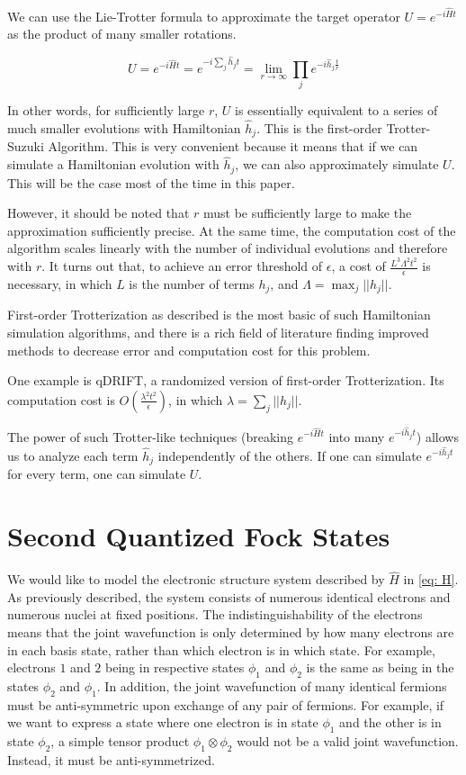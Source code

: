 We can use the Lie-Trotter formula to approximate the target operator $U = e^{-i\hat{H}t}$ as the product of many smaller rotations.

\begin{equation}
    U = e^{-i\hat{H}t} = e^{-i\sum_j \hat{h}_jt} = \lim_{r \rightarrow \infty} \prod_j e^{-i\hat{h}_j\frac{t}{r}}
\end{equation}

In other words, for sufficiently large $r$, $U$ is essentially equivalent to a series of much smaller evolutions with Hamiltonian $\hat{h}_j$. This is the first-order Trotter-Suzuki Algorithm. This is very convenient because it means that if we can simulate a Hamiltonian evolution with $\hat{h}_j$, we can also approximately simulate $U$. This will be the case most of the time in this paper.

However, it should be noted that $r$ must be sufficiently large to make the approximation sufficiently precise. At the same time, the computation cost of the algorithm scales linearly with the number of individual evolutions and therefore with $r$. It turns out that, to achieve an error threshold of $\epsilon$, a cost of $\frac{L^3\Lambda^2t^2}{\epsilon}$ is necessary, in which $L$ is the number of terms $h_j$, and $\Lambda = \max_j ||h_j||$.

First-order Trotterization as described is the most basic of such Hamiltonian simulation algorithms, and there is a rich field of literature finding improved methods to decrease error and computation cost for this problem.

One example is qDRIFT, a randomized version of first-order Trotterization. Its computation cost is $O(\frac{\lambda^2 t^2}{\epsilon})$, in which $\lambda = \sum_j ||h_j||$.

The power of such Trotter-like techniques (breaking $e^{-i\hat{H}t}$ into many $e^{-i\hat{h}_jt}$) allows us to analyze each term $\hat{h}_j$ independently of the others. If one can simulate $e^{-i\hat{h}_jt}$ for every term, one can simulate $U$.

\section{Second Quantized Fock States}

We would like to model the electronic structure system described by $\hat{H}$ in \eqref{eq: H}. As previously described, the system consists of numerous identical electrons and numerous nuclei at fixed positions. The indistinguishability of the electrons means that the joint wavefunction is only determined by how many electrons are in each basis state, rather than which electron is in which state. For example, electrons $1$ and $2$ being in respective states $\phi_1$ and $\phi_2$ is the same as being in the states $\phi_2$ and $\phi_1$. In addition, the joint wavefunction of many identical fermions must be anti-symmetric upon exchange of any pair of fermions. For example, if we want to express a state where one electron is in state $\phi_1$ and the other is in state $\phi_2$, a simple tensor product $\phi_1 \otimes \phi_2$ would not be a valid joint wavefunction. Instead, it must be anti-symmetrized.

